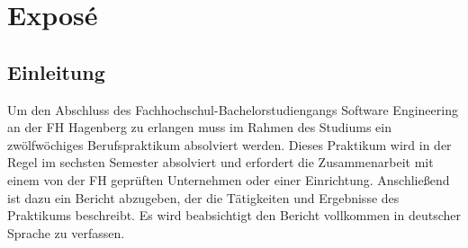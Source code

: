 \chapter{Exposé}

\section{Einleitung}



	Um den Abschluss des Fachhochschul-Bachelorstudiengangs Software Engineering an der FH Hagenberg zu erlangen muss im Rahmen des Studiums ein zwölfwöchiges
	Berufspraktikum absolviert werden. Dieses Praktikum wird in der Regel im sechsten Semester absolviert und erfordert die Zusammenarbeit mit einem von der FH 
	geprüften Unternehmen oder einer Einrichtung. Anschließend ist dazu ein Bericht abzugeben, der die Tätigkeiten
	und Ergebnisse des Praktikums beschreibt. Es wird beabsichtigt den Bericht vollkommen in deutscher Sprache zu verfassen.

